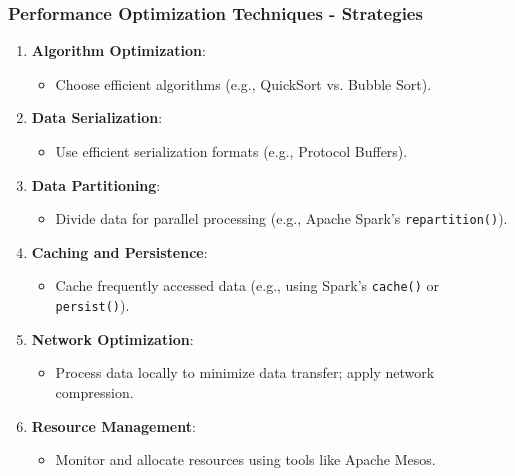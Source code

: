 \documentclass[aspectratio=169]{beamer}
\begin{document}
\begin{frame}[fragile]
    \frametitle{Performance Optimization Techniques - Strategies}
    \begin{enumerate}
        \item \textbf{Algorithm Optimization}:
        \begin{itemize}
            \item Choose efficient algorithms (e.g., QuickSort vs. Bubble Sort).
        \end{itemize}

        \item \textbf{Data Serialization}:
        \begin{itemize}
            \item Use efficient serialization formats (e.g., Protocol Buffers).
        \end{itemize}

        \item \textbf{Data Partitioning}:
        \begin{itemize}
            \item Divide data for parallel processing (e.g., Apache Spark's \texttt{repartition()}).
        \end{itemize}

        \item \textbf{Caching and Persistence}:
        \begin{itemize}
            \item Cache frequently accessed data (e.g., using Spark's \texttt{cache()} or \texttt{persist()}).
        \end{itemize}

        \item \textbf{Network Optimization}:
        \begin{itemize}
            \item Process data locally to minimize data transfer; apply network compression.
        \end{itemize}
        
        \item \textbf{Resource Management}:
        \begin{itemize}
            \item Monitor and allocate resources using tools like Apache Mesos.
        \end{itemize}
    \end{enumerate}
\end{frame}
\end{document}
